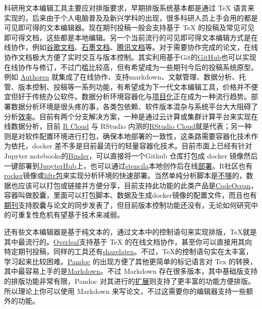 \documentclass[]{tufte-book}
\begin{document}
科研用文本编辑工具主要应对排版要求，早期排版系统基本都是通过 TeX 语言来实现的，后来由于个人电脑普及及新兴学科的出现，很多科研人员上手会用的都是可见即可得的文本编辑器。现在期刊投稿一般会支持基于 TeX 的投稿及常见可见即可得文档，这些都是本地编辑。另一个当前流行的可见即可得文本编辑方式是在线协作，例如\href{https://docs.google.com/}{谷歌文档}、\href{https://shimo.im/}{石墨文档}、\href{https://docs.qq.com/}{腾讯文档}等。对于需要协作完成的论文，在线协作文档极大方便了实时交互与版本控制。其实利用基于Git的\href{https://github.com/}{GitHub}也可以实现在线协作与修订，不过门槛比较高，但有希望成为一些期刊今后的投稿系统原型。例如 \href{https://www.authorea.com}{Authorea} 就集成了在线协作、支持markdown、文献管理、数据分析、托管、版本控制、投稿等一系列功能，有希望成为下一代文本编辑工具，价格并不便宜但好于传统办公软件。数据分析环境容器化与\href{https://my.scinote.net/projects}{项目化}正在成为一种流行趋势。部署数据分析环境是很头疼的事，各类包依赖、软件版本混杂与系统平台大大阻碍了分析\href{https://www.nature.com/news/1-500-scientists-lift-the-lid-on-reproducibility-1.19970}{效率}。目前有两个分支解决方案，一种是通过云计算或集群计算平台来实现在线数据分析，目前 \href{https://rcloud.social/index.html}{R Cloud} 与 RStudio 内测的\href{https://rstudio.cloud}{RStudio Cloud}就是代表；另一种则是对软件配置环境进行打包，确保本地部署的一致性，这条路需要容器化技术作为依托，docker 差不多是目前最流行的轻量容器化技术。目前市面上已经有针对Jupyter notebooks的\href{https://mybinder.org/}{Binder}，可以直接将一个Github 仓库打包成 docker 镜像然后一键部署到\href{https://jupyterhub.readthedocs.io/en/latest/index.html}{JupyterHub}上，也可以通过\href{https://stenci.la/}{stencila}本地创作后在线\href{https://github.com/minrk/nbstencilaproxy}{部署}。R社区也有\href{https://www.rocker-project.org/}{rocker}镜像或\href{https://cran.r-project.org/web/packages/liftr/vignettes/liftr-intro.html}{liftr包}来实现分析环境的快速部署。当然单纯分析脚本是\href{https://markwoodbridge.com/2017/03/05/jupyter-reproducible-science.html}{不够}的，数据也应该可以打包或链接并方便分享，目前支持此功能的此类产品是\href{https://codeocean.com}{CodeOcean}，容器叫做胶囊，里面可以打包脚本、数据及生成docker镜像的配置文件，而且也有\href{https://f1000research.com/articles/4-121/v1}{期刊}支持胶囊与论文的同步发表了，但目前版本控制功能还没有，无论如何研究中的可重复性危机有望基于技术来减弱。

还有些文本编辑器是基于纯文本的，通过文本中的控制语句来实现排版，TeX就是其中最流行的。\href{https://www.overleaf.com/}{Overleaf}支持基于 TeX 的在线文档协作，甚至你可以直接用其向特定期刊投稿，同样的工具还有\href{https://www.sharelatex.com/}{sharelatex}。不过，TeX的控制语句实在太丰富，学习起来比较困难。\href{https://pandoc.org/}{Pandoc} 的出现方便了其他更简单的标记语言对 Tex 的转换，其中最容易上手的是\href{https://daringfireball.net/projects/markdown/}{Markdown}。不过 Markdown 存在很多版本，其中基础版支持的排版功能非常有限，Pandoc 对其进行的\href{https://pandoc.org/MANUAL.html\#pandocs-markdown}{扩展}则支持了更丰富的功能方便排版。所以理论上你可以使用 Markdown 来写论文，不过这需要你的编辑器支持一些额外的功能。
\end{document}
